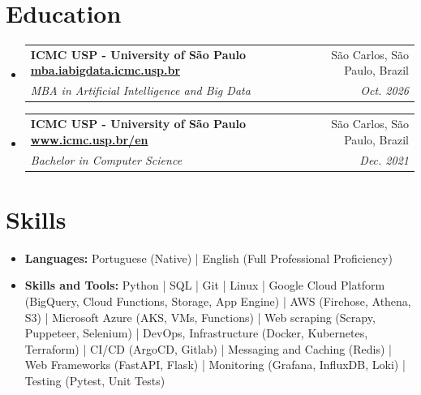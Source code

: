 \documentclass[letterpaper,11pt]{article}
\makeatletter
\newcommand{\resumeItemNoTitle}[1]{
    \item\small{
        {#1 \vspace{-2pt}}
    }
}
\newcommand{\resumeSubheading}[4]{
  \vspace{-1pt}\item
    \begin{tabular*}{0.97\textwidth}[t]{l@{\extracolsep{\fill}}r}
      \textbf{#1} & #2 \\
      \textit{\small#3} & \textit{\small #4} \\
    \end{tabular*}\vspace{-5pt}
}
\newcommand{\resumeSubHeadingListStart}{\begin{itemize}[leftmargin=*]}
\newcommand{\resumeSubHeadingListEnd}{\end{itemize}}
\newcommand{\resumeItemListStart}{\begin{itemize}[leftmargin=*]\setlength\itemsep{1mm}}
\newcommand{\resumeItemListEnd}{\end{itemize}\vspace{-5pt}}
\makeatother
\begin{document}
\section{Education}
  \resumeSubHeadingListStart
    \resumeSubheading
      {ICMC USP - University of São Paulo \href{https://mba.iabigdata.icmc.usp.br/}{mba.iabigdata.icmc.usp.br}}{São Carlos, São Paulo, Brazil}
      {MBA in Artificial Intelligence and Big Data }{Oct. 2026}

    \resumeSubheading
      {ICMC USP - University of São Paulo \href{https://www.icmc.usp.br/en/}{www.icmc.usp.br/en}}{São Carlos, São Paulo, Brazil}
      {Bachelor in Computer Science }{Dec. 2021}

  \resumeSubHeadingListEnd
 
    

\section{Skills}
  \resumeItemListStart
    \resumeItemNoTitle{\textbf{Languages:} Portuguese (Native) | English (Full Professional Proficiency)}
    \resumeItemNoTitle{\textbf{Skills and Tools:} Python | SQL | Git | Linux | Google Cloud Platform (BigQuery, Cloud Functions, Storage, App Engine) | AWS (Firehose, Athena, S3) | Microsoft Azure (AKS, VMs, Functions) | Web scraping (Scrapy, Puppeteer, Selenium) | DevOps, Infrastructure (Docker, Kubernetes, Terraform) | CI/CD (ArgoCD, Gitlab) | Messaging and Caching (Redis) | Web Frameworks (FastAPI, Flask) | Monitoring (Grafana, InfluxDB, Loki) | Testing (Pytest, Unit Tests)}
  \resumeItemListEnd


\end{document}

